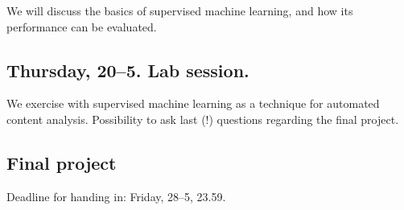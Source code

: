 We will discuss the basics of supervised machine learning, and how its performance can be evaluated. 

\subsection*{Thursday, 20--5. Lab session.}
We exercise with supervised machine learning as a technique for automated content analysis. Possibility to ask last (!) questions regarding the final project.


\subsection*{Final project}
Deadline for handing in: Friday, 28--5, 23.59.



